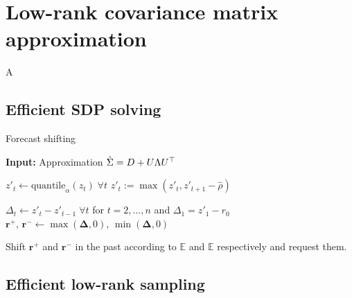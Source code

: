 \section{Low-rank covariance matrix approximation}\label{sec:low_rank_sigma}

A~\cite{big_data_low_rank}

\subsection{Efficient SDP solving}\label{subsec:low_rank_sdp}

\begin{algorithm}
    \caption{Forecast shifting}\label{alg:forecast_shifting}
    \begin{algorithmic}[1]
        \State \textbf{Input:} Approximation $\hat{\Sigma} = D + U \Lambda U^\top$
        \item[]
        \State $z'_t \gets \text{quantile}_\alpha(z_t) \; \forall t$ 
        \State $z'_t := \max(z'_t, z'_{t + 1} - \hat{\rho})$
        \EndFor
        \item[]
        \State $\Delta_t \gets z'_t - z'_{t - 1}\; \forall t$ for $t = 2,\dots, n$ and $\Delta_1 = z'_1 - r_0$
        \State $\mathbf{r^+},\,\mathbf{r^-} \gets \max(\mathbf{\Delta}, 0),\,\min(\mathbf{\Delta}, 0)$
        \item[]
        \State Shift $\mathbf{r^+}$ and $\mathbf{r^-}$ in the past according to $\mathbb{E}$
        and $\mathbb{E}$ respectively and request them.
    \end{algorithmic}
\end{algorithm}

\subsection{Efficient low-rank sampling}\label{subsec:low_rank_sampling}

